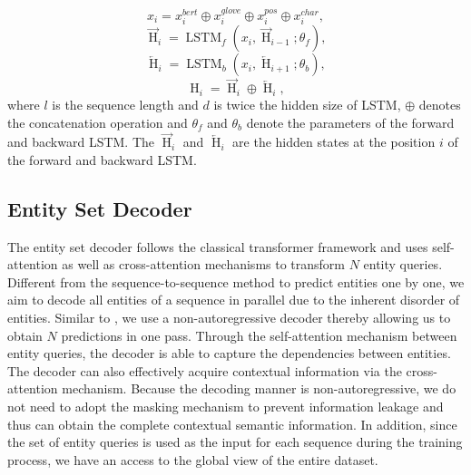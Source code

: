 \documentclass{article}
\begin{document}
\begin{equation}
x_{i}=x_{i}^{bert} \oplus x_{i}^{glove} \oplus x_{i}^{pos} \oplus x_{i}^{char},
\end{equation}
\begin{equation}
\overrightarrow{\operatorname{H}}_{i}=\operatorname{LSTM}_{f}\left(x_{i}, \overrightarrow{\operatorname{H}}_{i-1}; \theta_f\right),
\end{equation}
\begin{equation}
\overleftarrow{\operatorname{H}}_{i}=\operatorname{LSTM}_{b}\left(x_{i}, \overleftarrow{\operatorname{H}}_{i+1}; \theta_b\right),
\end{equation}
\begin{equation}
\operatorname{H}_{i}=\overrightarrow{\operatorname{H}}_{i} \oplus \overleftarrow{\operatorname{H}}_{i},
\end{equation}
where $l$ is the sequence length and $d$ is twice the hidden size of LSTM, $\oplus$ denotes the concatenation operation and $\theta_f$ and $\theta_b$ denote the parameters of the forward and backward LSTM. The $\overrightarrow{\operatorname{H}}_{i}$ and $\overleftarrow{\operatorname{H}}_{i}$ are the hidden states at the position $i$ of the forward and backward LSTM.


\subsection{Entity Set Decoder}
The entity set decoder follows the classical transformer framework and uses self-attention as well as cross-attention mechanisms to transform $N$ entity queries. Different from the sequence-to-sequence method \cite{strakova2019neural} to predict entities one by one, we aim to decode all entities of a sequence in parallel due to the inherent disorder of entities. Similar to \cite{gu2018non}, we use a non-autoregressive decoder thereby allowing us to obtain $N$ predictions in one pass. Through the self-attention mechanism between entity queries, the decoder is able to capture the dependencies between entities. The decoder can also effectively acquire contextual information via the cross-attention mechanism. Because the decoding manner is non-autoregressive, we do not need to adopt the masking mechanism to prevent information leakage and thus can obtain the complete contextual semantic information. In addition, since the set of entity queries is used as the input for each sequence during the training process, we have an access to the global view of the entire dataset.
\end{document}
